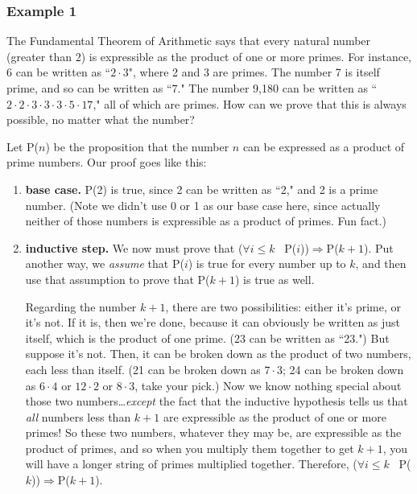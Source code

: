 \subsubsection{Example 1}

The Fundamental Theorem of Arithmetic says that every natural number
(greater than 2) is expressible as the product of one or more primes.  For
instance, 6 can be written as ``$2 \cdot 3$", where 2 and 3 are primes. The
number 7 is itself prime, and so can be written as ``$7$." The number 9,180
can be written as ``$2 \cdot 2 \cdot 3 \cdot 3 \cdot 3 \cdot 5 \cdot 17$," all of
which are primes. How can we prove that this is always possible, no matter
what the number?

Let P($n$) be the proposition that the number $n$ can be expressed as a
product of prime numbers. Our proof goes like this:

\begin{enumerate} 

\item \textbf{base case.} P(2) is true, since 2 can be written as ``2," and
2 is a prime number. (Note we didn't use 0 or 1 as our base case here,
since actually neither of those numbers is expressible as a product of
primes. Fun fact.)

\item \textbf{inductive step.}
We now must prove that ($\forall i \leq k$ \ P($i$))$\Rightarrow$P($k+1$).
Put another way, we \textit{assume} that P($i$) is true for every number up
to $k$, and then use that assumption to prove that P($k+1$) is true as
well.

Regarding the number $k+1$, there are two possibilities: either it's prime,
or it's not. If it is, then we're done, because it can obviously be written
as just itself, which is the product of one prime. (23 can be written as
``23.") But suppose it's not.
Then, it can be broken down as the product of two numbers, each less than
itself. (21 can be broken down as $7 \cdot 3$; 24 can be broken down as $6
\cdot 4$ or $12 \cdot 2$ or $8 \cdot 3$, take your pick.) Now we know nothing
special about those two numbers\dots \textit{except} the fact that the
inductive hypothesis tells us that \textit{all} numbers less than $k+1$ are
expressible as the product of one or more primes! So these two numbers,
whatever they may be, are expressible as the product of primes, and so when
you multiply them together to get $k+1$, you will have a longer string of
primes multiplied together. Therefore, ($\forall i \leq k$ \
P($k$))$\Rightarrow$P($k+1$).

\end{enumerate}

